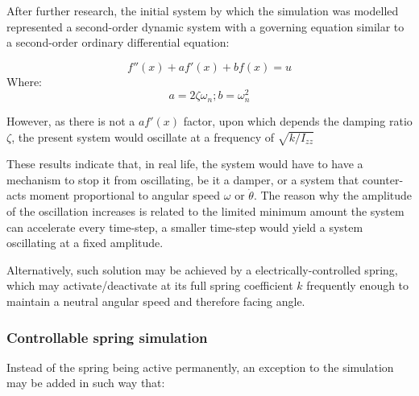 After further research, the initial system by which the simulation was mo\-del\-led represented a second-order dynamic system with a governing equation similar to a second-order ordinary differential equation:

\begin{equation}
f''(x) + af'(x) + bf(x) = u \label{dyneq}
\end{equation}
Where:
$$a = 2 \zeta \omega_n ; b = \omega_n^2$$

However, as there is not a $af'(x)$ factor, upon which depends the damping ratio $\zeta$, the present system would oscillate at a frequency of $\sqrt{k/I_{zz}}$

These results indicate that, in real life, the system would have to have a mechanism to stop it from oscillating, be it a damper, or a system that counter-acts moment proportional to angular speed $\omega$ or $\dot{\theta}$. The reason why the amplitude of the oscillation increases is related to the limited minimum amount the system can accelerate every time-step, a smaller time-step would yield a system oscillating at a fixed amplitude.

Alternatively, such solution may be achieved by a electrically-controlled spring, which may activate/deactivate at its full spring coefficient $k$ frequently enough to maintain a neutral angular speed and therefore facing angle.

\subsubsection{Controllable spring simulation}



Instead of the spring being active permanently, an exception to the simulation may be added in such way that:

